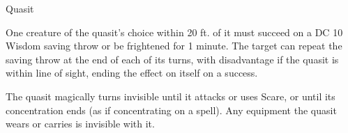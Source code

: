 \begin{monsterbox}{Quasit}
\begin{monsteraction}
One creature of the quasit's choice within 20 ft. of it must succeed on a DC 10 Wisdom saving throw or be frightened for 1 minute. The target can repeat the saving throw at the end of each of its turns, with disadvantage if the quasit is within line of sight, ending the effect on itself on a success.
\end{monsteraction}
\begin{monsteraction}[Invisibility]
The quasit magically turns invisible until it attacks or uses Scare, or until its concentration ends (as if concentrating on a spell). Any equipment the quasit wears or carries is invisible with it.
\end{monsteraction}
\end{monsterbox}